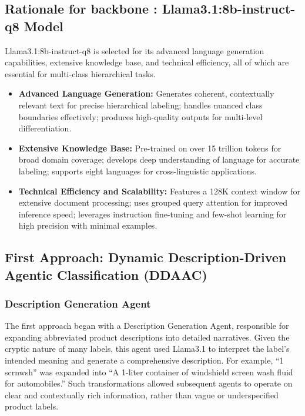 \documentclass[9pt,a4paper,twoside]{rho-class/rho}
\begin{document}
    \subsection{Rationale for backbone : Llama3.1:8b-instruct-q8 Model}

Llama3.1:8b-instruct-q8 is selected for its advanced language generation capabilities, extensive knowledge base, and technical efficiency, all of which are essential for multi-class hierarchical tasks.

\begin{itemize}
    \item \textbf{Advanced Language Generation:} Generates coherent, contextually relevant text for precise hierarchical labeling; handles nuanced class boundaries effectively; produces high-quality outputs for multi-level differentiation.
    
    \item \textbf{Extensive Knowledge Base:} Pre-trained on over 15 trillion tokens for broad domain coverage; develops deep understanding of language for accurate labeling; supports eight languages for cross-linguistic applications.

    \item \textbf{Technical Efficiency and Scalability:} Features a 128K context window for extensive document processing; uses grouped query attention for improved inference speed; leverages instruction fine-tuning and few-shot learning for high precision with minimal examples.
\end{itemize}

\subsection{First Approach: Dynamic Description-Driven Agentic Classification (DDAAC)}

\subsubsection{Description Generation Agent}
The first approach began with a Description Generation Agent, responsible for expanding abbreviated product descriptions into detailed narratives. Given the cryptic nature of many labels, this agent used Llama3.1 to interpret the label's intended meaning and generate a comprehensive description. For example, “1 scrnwsh” was expanded into “A 1-liter container of windshield screen wash fluid for automobiles.” Such transformations allowed subsequent agents to operate on clear and contextually rich information, rather than vague or underspecified product labels.
\end{document}
